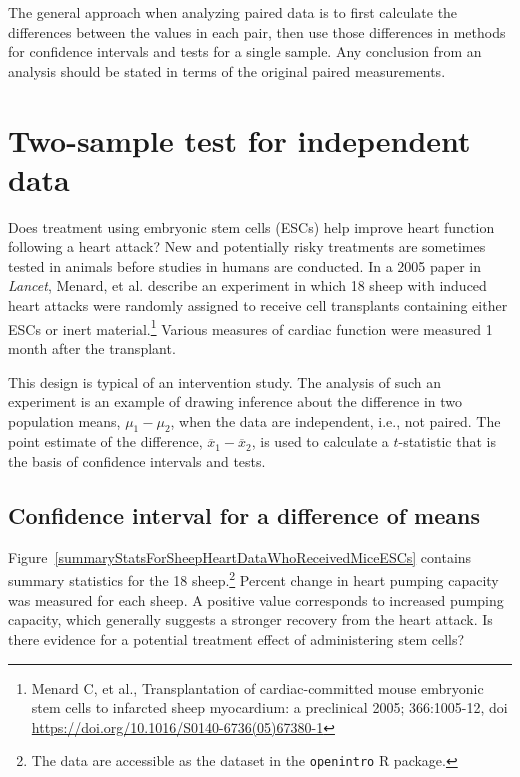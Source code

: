 The general approach when analyzing paired data is to first calculate the differences between the values in each pair, then use those differences in methods for confidence intervals and tests for a single sample.  Any conclusion from an analysis should be stated in terms of the original paired measurements.


\section{Two-sample test for independent data}
\label{differenceOfTwoMeans}

Does treatment using embryonic stem cells (ESCs) help improve heart function following a heart attack? New and potentially risky treatments are sometimes tested in animals before studies in humans are conducted.  In a 2005 paper in \textit{Lancet}, Menard, et al. describe an experiment in which 18 sheep with induced heart attacks were randomly assigned to receive cell transplants containing either ESCs or inert material.\footnote{Menard C, et al., Transplantation of cardiac-committed mouse embryonic stem cells to infarcted sheep myocardium: a preclinical 2005; 366:1005-12, doi \url{https://doi.org/10.1016/S0140-6736(05)67380-1}}  Various measures of cardiac function were measured 1 month after the transplant.

This design is typical of an intervention study. The analysis of such an experiment is an example of drawing inference about the difference in two population means, $\mu_1 - \mu_2$, when the data are independent, i.e., not paired. The point estimate of the difference, $\overline{x}_1 - \overline{x}_2$, is used to calculate a $t$-statistic that is the basis of confidence intervals and tests.


\subsection{Confidence interval for a difference of means}
\label{confidenceIntervalDifferenceMeans}

Figure~\ref{summaryStatsForSheepHeartDataWhoReceivedMiceESCs} contains summary statistics for the 
18 sheep.\footnote{The data are accessible as the dataset  in the \texttt{openintro} \textsf{R} package.}  Percent change in heart pumping capacity was measured for each sheep. A positive value corresponds to increased pumping capacity, which generally suggests a stronger recovery from the heart attack.  Is there evidence for a potential treatment effect of administering stem cells?


